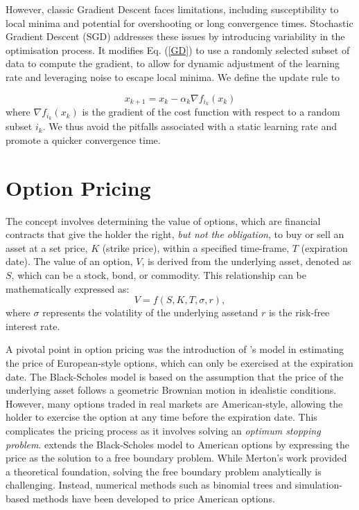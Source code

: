 \documentclass[a4paper]{report}
\begin{document}
However, classic Gradient Descent faces limitations, including susceptibility to local minima and potential for overshooting or long convergence times. Stochastic Gradient Descent (SGD) addresses these issues by introducing variability in the optimisation process. It modifies Eq. (\ref{GD}) to use a randomly selected subset of data to compute the gradient, to allow for dynamic adjustment of the learning rate and leveraging noise to escape local minima. We define the update rule to 

\begin{equation}\label{SGD}
x_{k+1} = x_k - \alpha_k \nabla f_{i_k}(x_k)	
\end{equation}
where $\nabla f_{i_k}(x_k)$ is the gradient of the cost function with respect to a random subset $i_k$. We thus avoid the pitfalls associated with a static learning rate and promote a quicker convergence time.

\section{Option Pricing}\label{section:option_pricing}
The concept involves determining the value of options, which are financial contracts that give the holder the right, \textit{but not the obligation}, to buy or sell an asset at a set price, $K$ (strike price), within a specified time-frame, $T$ (expiration date). The value of an option, $V$, is derived from the underlying asset, denoted as $S$, which can be a stock, bond, or commodity. This relationship can be mathematically expressed as:
\begin{equation}
	V = f(S, K, T, \sigma, r),
\end{equation}
where $\sigma$ represents the volatility of the underlying asset\footnotemark[1] and $r$ is the risk-free interest rate\footnotemark[2].


A pivotal point in option pricing was the introduction of \citet{black1973pricing}'s model in estimating the price of European-style options, which can only be exercised at the expiration date. The Black-Scholes model is based on the assumption that the price of the underlying asset follows a geometric Brownian motion in idealistic conditions. However, many options traded in real markets are American-style, allowing the holder to exercise the option at any time before the expiration date. This complicates the pricing process as it involves solving an \textit{optimum stopping problem}. \citet{merton1973theory} extends the Black-Scholes model to American options by expressing the price as the solution to a free boundary problem. While Merton's work provided a theoretical foundation, solving the free boundary problem analytically is challenging. Instead, numerical methods such as binomial trees \citep{cox1979option} and simulation-based methods \citep{longstaff2001simulation} have been developed to price American options.
\end{document}
